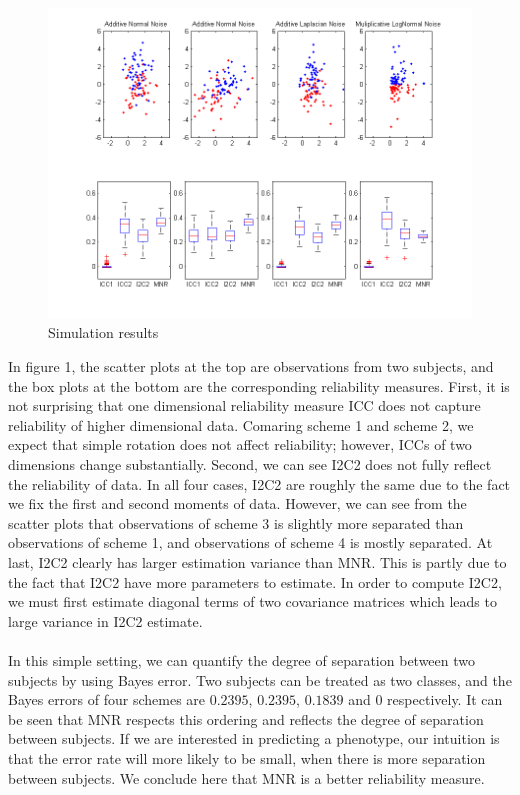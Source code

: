 \documentclass[11pt,journal,compsoc]{IEEEtran}
\begin{document}
\begin{figure}[t!]
\begin{center}
\includegraphics[width=5in]{Simu1}
\end{center}
\caption{Simulation results}
\end{figure}

\noindent In figure 1, the scatter plots at the top are observations from two subjects, and the box plots at the bottom are the corresponding reliability measures. First, it is not surprising that one dimensional reliability measure ICC does not capture reliability of higher dimensional data. Comaring scheme 1 and scheme 2, we expect that simple rotation does not affect reliability; however, ICCs of two dimensions change substantially. Second, we can see I2C2 does not fully reflect the reliability of data. In all four cases, I2C2 are roughly the same due to the fact we fix the first and second moments of data. However, we can see from the scatter plots that observations of scheme 3 is slightly more separated than observations of scheme 1, and observations of scheme 4 is mostly separated. At last, I2C2 clearly has larger estimation variance than MNR. This is partly due to the fact that I2C2 have more parameters to estimate. In order to compute I2C2, we must first estimate diagonal terms of two covariance matrices which leads to large variance in I2C2 estimate.   \\
\\
In this simple setting, we can quantify the degree of separation between two subjects by using Bayes error. Two subjects can be treated as two classes, and the Bayes errors of four schemes are $0.2395$, $0.2395$, $0.1839$ and $0$ respectively. It can be seen that MNR respects this ordering and reflects the degree of separation between subjects.   If we are interested in predicting a phenotype, our intuition is that the error rate will more likely to be small, when there is more separation between subjects. We conclude here that MNR is a better reliability measure.
\end{document}
